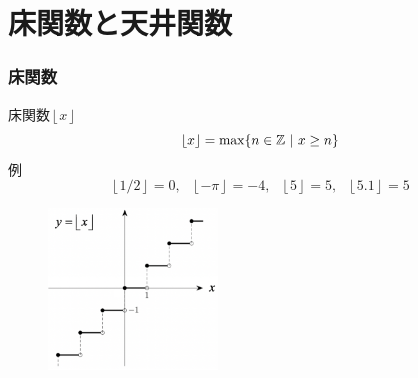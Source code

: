 
\section{床関数と天井関数}


\begin{frame}
\frametitle{床関数}   


床関数$\left \lfloor{x}\right \rfloor $
$$
\left \lfloor{x}\right \rfloor = \max\{ n \in \mathbb{Z} \ | \ x \ge n\}
$$
例
$$
\left \lfloor{1/2}\right \rfloor=0, \ \ \  \left \lfloor{-\pi}\right \rfloor=-4, \ \ \ \left \lfloor{5}\right \rfloor=5,  \ \ \ \left \lfloor{5.1}\right \rfloor=5
$$

\vspace{-1mm}

\begin{figure}[htbp]
 \begin{center} 
  \includegraphics[width=45mm]{calculus2/floor.png}
 \end{center}
\end{figure}
\vspace{-4mm}

\end{frame}







